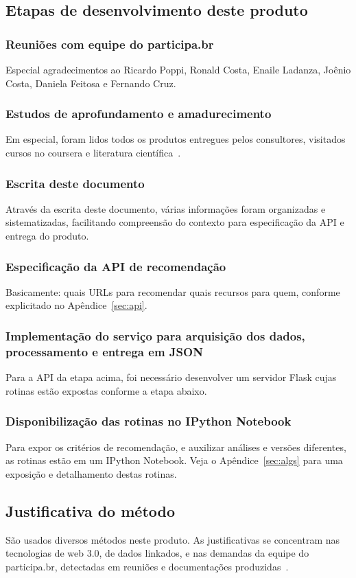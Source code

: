 \documentclass[12pt]{article}
\begin{document}
\subsection{Etapas de desenvolvimento deste produto}
\subsubsection{Reuniões com equipe do participa.br}
Especial agradecimentos ao Ricardo Poppi, Ronald Costa, Enaile Ladanza, Joênio Costa, Daniela Feitosa e Fernando Cruz.
\subsubsection{Estudos de aprofundamento e amadurecimento}
Em especial, foram lidos todos os produtos entregues pelos consultores, visitados cursos no coursera e literatura científica~\cite{pnudExtra}.
\subsubsection{Escrita deste documento}
Através da escrita deste documento, várias informações foram organizadas e sistematizadas, facilitando compreensão do contexto para especificação da API e entrega do produto.
\subsubsection{Especificação da API de recomendação}
Basicamente: quais URLs para recomendar quais recursos para quem, conforme explicitado no Apêndice~\ref{sec:api}.
\subsubsection{Implementação do serviço para arquisição dos dados, processamento e entrega em JSON}
Para a API da etapa acima, foi necessário desenvolver um servidor Flask cujas rotinas estão expostas conforme a etapa abaixo.
\subsubsection{Disponibilização das rotinas no IPython Notebook}
Para expor os critérios de recomendação, e auxilizar análises e versões diferentes, as rotinas estão em um IPython Notebook. Veja o Apêndice~\ref{sec:algs} para uma exposição e detalhamento destas rotinas.
\subsection{Justificativa do método}
São usados diversos métodos neste produto. As justificativas se concentram nas tecnologias de web 3.0, de dados linkados, e nas demandas da equipe do participa.br, detectadas em reuniões e documentações produzidas~\cite{pnudExtra}.
\end{document}
